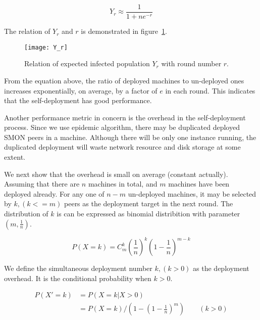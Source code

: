 \begin{equation*}
Y_r \approx \frac{1}{1+ne^{-r}}
\end{equation*}

The relation of $Y_r$ and $r$ is demonstrated in
figure~\ref{fig:yr}.

\begin{figure}
\centering
\texttt{[image: Y\_r]}
\caption{Relation of expected infected population $Y_r$ with
round number $r$.}
\label{fig:yr}
\end{figure}

From the equation above, the ratio of deployed machines to
un-deployed ones increases exponentially, on average, by a
factor of $e$ in each round.  This indicates that the
self-deployment has good performance.
%
%
%


Another performance metric in concern is the overhead in
the self-deployment process. Since we use epidemic
algorithm, there may be duplicated deployed SMON peers in a
machine. Although there will be only one instance running,
the duplicated deployment will waste network resource and
disk storage at some extent.

We next show that the overhead is small on average (constant
actually). Assuming that there are $n$ machines in total,
and $m$ machines have been deployed already. For any one of
$n-m$ un-deployed machines, it may be selected by $k, (k <=
m)$ peers as the deployment target in the next round.  The
distribution of $k$ is can be expressed as binomial
distribition with parameter $(m, \frac{1}{n})$.

\begin{equation*}
P(X=k) = C_m^k (\frac{1}{n})^k (1 - \frac{1}{n})^{m - k}
\end{equation*}

We define the simultaneous deployment number $k, (k > 0)$ as
the deployment overhead. It is the conditional probability
when $k > 0$.

\begin{equation*}
\begin{aligned}
P(X' = k) &= P(X=k | X > 0) \\
&= P(X = k) / (1 - (1 - \frac{1}{n})^{m}) \qquad (k > 0)
\end{aligned}
\end{equation*}

